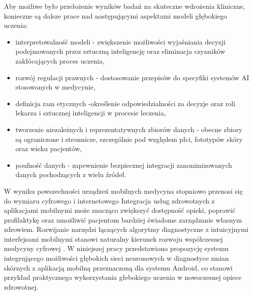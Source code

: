 Aby możliwe było przełożenie wyników badań na skuteczne wdrożenia kliniczne, konieczne są dalsze prace nad następującymi aspektami modeli głębokiego uczenia:
\begin{itemize}
	\item interpretowalność modeli - zwiększenie możliwości wyjaśniania decyzji podejmowanych przez sztuczną inteligencję oraz eliminacja czynników zakłócających proces uczenia,
	\item rozwój regulacji prawnych - dostosowanie przepisów do specyfiki systemów AI stosowanych w medycynie,
	\item definicja ram etycznych -określenie odpowiedzialności za decyzje oraz roli lekarza i sztucznej inteligencji w procesie leczenia,
	\item tworzenie niezależnych i reprezentatywnych zbiorów danych - obecne zbiory są ograniczone i stronnicze, szczególnie pod względem płci, fototypów skóry oraz wieku pacjentów,
	\item poufność danych - zapewnienie bezpiecznej integracji zanonimizowanych danych pochodzących z wielu źródeł.
\end{itemize}

W wyniku powszechności urządzeń mobilnych medycyna stopniowo przenosi się do wymiaru cyfrowego i internetowego
Integracja usług zdrowotnych z aplikacjami mobilnymi może znacząco zwiększyć dostępność opieki, poprawić profilaktykę oraz umożliwić pacjentom bardziej świadome zarządzanie własnym zdrowiem.
Rozwijanie narzędzi łączących algorytmy diagnostyczne z intuicyjnymi interfejsami mobilnymi stanowi naturalny kierunek rozwoju współczesnej medycyny cyfrowej \cite{Ajisafe_2020, Bourouis_Zerdazi_Feham_Bouchachia_2013}.
W niniejszej pracy przedstawiono propozycję systemu integrującego możliwości głębokich sieci neuronowych w diagnostyce zmian skórnych z aplikacją mobilną przeznaczoną dla systemu Android, co stanowi przykład praktycznego wykorzystania głebokiego uczenia w nowoczesnej opiece zdrowotnej.
